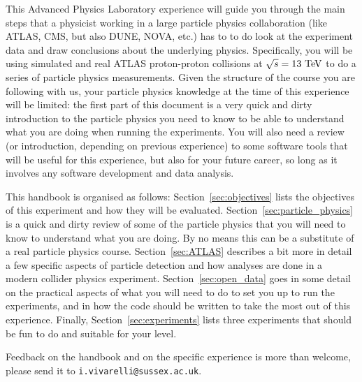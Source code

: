 
This Advanced Physics Laboratory experience will guide you through the main steps that a physicist working in a large particle physics collaboration (like ATLAS, CMS, but also DUNE, NOVA, etc.) has to to do look at the experiment data and draw conclusions about the underlying physics. Specifically, you will be using simulated and real ATLAS proton-proton collisions at $\sqrt{s} = 13\ \TeV$ to do a series of particle physics measurements. Given the structure of the course you are following with us, your particle physics knowledge at the time of this experience will be limited: the first part of this document is a very quick and dirty introduction to the particle physics you need to know to be able to understand what you are doing when running the experiments. You will also need a review (or introduction, depending on previous experience) to some software tools that will be useful for this experience, but also for your future career, so long as it involves any software development and data analysis. 

This handbook is organised as follows: Section~\ref{sec:objectives} lists the objectives of this experiment and how they will be evaluated. Section~\ref{sec:particle_physics} is a quick and dirty review of some of the particle physics that you will need to know to understand what you are doing. By no means this can be a substitute of a real particle physics course. Section~\ref{sec:ATLAS} describes a bit more in detail a few specific aspects of particle detection and how analyses are done in a modern collider physics experiment. Section~\ref{sec:open_data} goes in some detail on the practical aspects of what you will need to do to set you up to run the experiments, and in how the code should be written to take the most out of this experience. Finally, Section~\ref{sec:experiments} lists three experiments that should be fun to do and suitable for your level. 

Feedback on the handbook and on the specific experience is more than welcome, please send it to \verb|i.vivarelli@sussex.ac.uk|. 